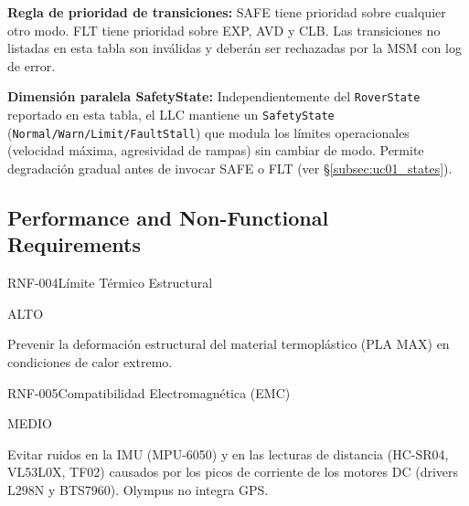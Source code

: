 \textbf{Regla de prioridad de transiciones:} SAFE tiene prioridad sobre cualquier otro modo. FLT tiene prioridad sobre EXP, AVD y CLB. Las transiciones no listadas en esta tabla son inválidas y deberán ser rechazadas por la MSM con log de error.

\textbf{Dimensión paralela SafetyState:} Independientemente del \texttt{RoverState} reportado en esta tabla, el LLC mantiene un \texttt{SafetyState} (\texttt{Normal/Warn/Limit/FaultStall}) que modula los límites operacionales (velocidad máxima, agresividad de rampas) sin cambiar de modo. Permite degradación gradual antes de invocar SAFE o FLT (ver \S\ref{subsec:uc01_states}).

\subsection{Performance and Non-Functional Requirements}

\begin{reqblock}{RNF-004}{Límite Térmico Estructural}
    \item[\textbf{Prioridad:}] ALTO
    \item[\textbf{Racional:}] Prevenir la deformación estructural del material termoplástico (PLA MAX) en condiciones de calor extremo.
\end{reqblock}

\begin{reqblock}{RNF-005}{Compatibilidad Electromagnética (EMC)}
    \item[\textbf{Prioridad:}] MEDIO
    \item[\textbf{Racional:}] Evitar ruidos en la IMU (MPU-6050) y en las lecturas de distancia (HC-SR04, VL53L0X, TF02) causados por los picos de corriente de los motores DC (drivers L298N y BTS7960). Olympus no integra GPS.
\end{reqblock}

